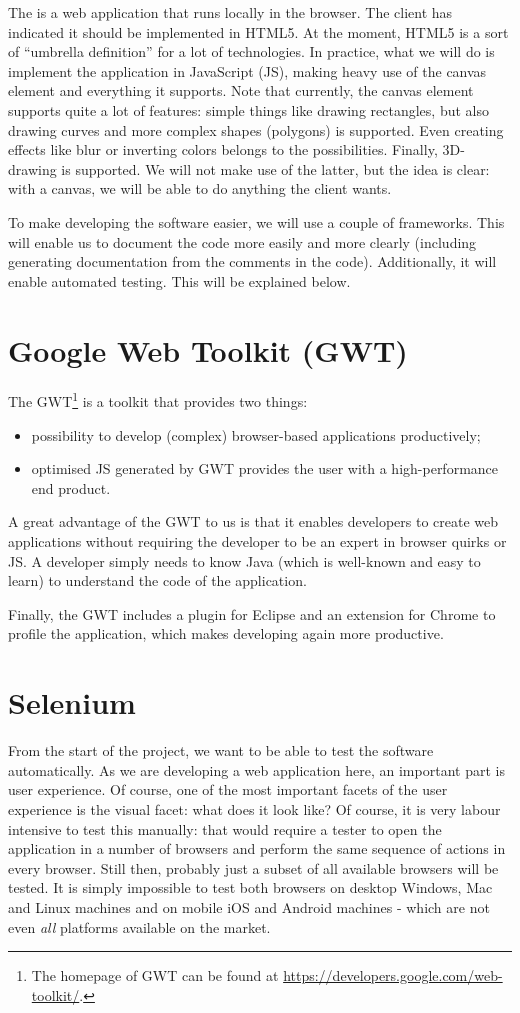 The \applicationname is a web application that runs locally in the browser. The client has indicated it should be implemented in HTML5. At the moment, HTML5 is a sort of ``umbrella definition'' for a lot of technologies. In practice, what we will do is implement the application in JavaScript (JS), making heavy use of the canvas element and everything it supports. Note that currently, the canvas element supports quite a lot of features: simple things like drawing rectangles, but also drawing curves and more complex shapes (polygons) is supported. Even creating effects like blur or inverting colors belongs to the possibilities. Finally, 3D-drawing is supported. We will not make use of the latter, but the idea is clear: with a canvas, we will be able to do anything the client wants.

To make developing the software easier, we will use a couple of frameworks. This will enable us to document the code more easily and more clearly (including generating documentation from the comments in the code). Additionally, it will enable automated testing. This will be explained below.

\section{Google Web Toolkit (GWT)}
The GWT\footnote{The homepage of GWT can be found at \url{https://developers.google.com/web-toolkit/}.} is a toolkit that provides two things:
\begin{itemize}
	\item possibility to develop (complex) browser-based applications productively;
	\item optimised JS generated by GWT provides the user with a high-performance end product.
\end{itemize}
A great advantage of the GWT to us is that it enables developers to create web applications without requiring the developer to be an expert in browser quirks or JS. A developer simply needs to know Java (which is well-known and easy to learn) to understand the code of the application.

Finally, the GWT includes a plugin for Eclipse and an extension for Chrome to profile the application, which makes developing again more productive.

\section{Selenium}
From the start of the project, we want to be able to test the software automatically. As we are developing a web application here, an important part is user experience. Of course, one of the most important facets of the user experience is the visual facet: what does it look like? Of course, it is very labour intensive to test this manually: that would require a tester to open the application in a number of browsers and perform the same sequence of actions in every browser. Still then, probably just a subset of all available browsers will be tested. It is simply impossible to test both browsers on desktop Windows, Mac and Linux machines and on mobile iOS and Android machines - which are not even \emph{all} platforms available on the market.


